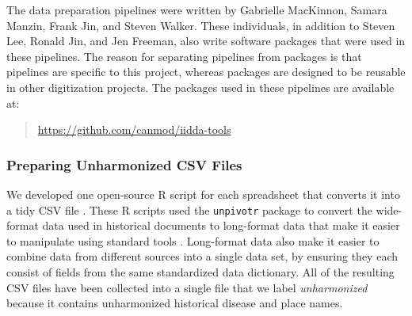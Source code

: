 \documentclass[12pt]{article}
\begin{document}
The data preparation pipelines were written by Gabrielle MacKinnon, Samara Manzin, Frank Jin, and Steven Walker. These individuals, in addition to Steven Lee, Ronald Jin, and Jen Freeman, also write software packages that were used in these pipelines. The reason for separating pipelines from packages is that pipelines are specific to this project, whereas packages are designed to be reusable in other digitization projects. The packages used in these pipelines are available at:
\begin{quote}
\url{https://github.com/canmod/iidda-tools}
\end{quote}

\subsubsection{Preparing Unharmonized CSV Files}\label{sec:appendix-unharmonized}

We developed one open-source R script for each spreadsheet that converts it into a tidy CSV file \cite{tidydata}. These R scripts used the \texttt{unpivotr} package \cite{unpivotr} to convert the wide-format data used in historical documents to long-format data that make it easier to manipulate using standard tools \cite{tidydata}. Long-format data also make it easier to combine data from different sources into a single data set, by ensuring they each consist of fields from the same standardized data dictionary. All of the resulting CSV files have been collected into a single file that we label \emph{unharmonized} because it contains unharmonized historical disease and place names.
\end{document}
